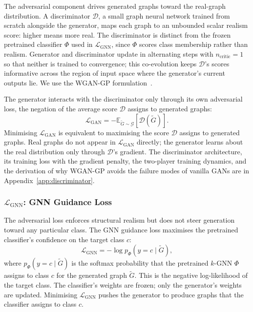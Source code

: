 \documentclass[12pt,a4paper]{article}
\begin{document}
The adversarial component drives generated graphs toward the real-graph distribution. A discriminator $\mathcal{D}$, a small graph neural network trained from scratch alongside the generator, maps each graph to an unbounded scalar realism score: higher means more real. The discriminator is distinct from the frozen pretrained classifier $\Phi$ used in $\mathcal{L}_{\text{GNN}}$, since $\Phi$ scores class membership rather than realism. Generator and discriminator update in alternating steps with $n_{\text{critic}} = 1$ so that neither is trained to convergence; this co-evolution keeps $\mathcal{D}$'s scores informative across the region of input space where the generator's current outputs lie. We use the WGAN-GP formulation~\cite{gulrajani2017improved}.

The generator interacts with the discriminator only through its own adversarial loss, the negation of the average score $\mathcal{D}$ assigns to generated graphs:
\begin{equation}
  \mathcal{L}_{\text{GAN}} = -\mathbb{E}_{\tilde{G} \sim \mathcal{G}}[\mathcal{D}(\tilde{G})].
  \label{eq:wgan-g}
\end{equation}
Minimising $\mathcal{L}_{\text{GAN}}$ is equivalent to maximising the score $\mathcal{D}$ assigns to generated graphs. Real graphs do not appear in $\mathcal{L}_{\text{GAN}}$ directly; the generator learns about the real distribution only through $\mathcal{D}$'s gradient. The discriminator architecture, its training loss with the gradient penalty, the two-player training dynamics, and the derivation of why WGAN-GP avoids the failure modes of vanilla GANs are in Appendix~\ref{app:discriminator}.

\subsubsection{$\mathcal{L}_{\text{GNN}}$: GNN Guidance Loss}

The adversarial loss enforces structural realism but does not steer generation toward any particular class. The GNN guidance loss maximises the pretrained classifier's confidence on the target class $c$:
\begin{equation}
  \mathcal{L}_{\text{GNN}} = -\log p_\Phi(y = c \mid \tilde{G}),
  \label{eq:gnn-loss}
\end{equation}
where $p_\Phi(y = c \mid \tilde{G})$ is the softmax probability that the pretrained $k$-GNN $\Phi$ assigns to class $c$ for the generated graph $\tilde{G}$. This is the negative log-likelihood of the target class. The classifier's weights are frozen; only the generator's weights are updated. Minimising $\mathcal{L}_{\text{GNN}}$ pushes the generator to produce graphs that the classifier assigns to class $c$.
\end{document}
